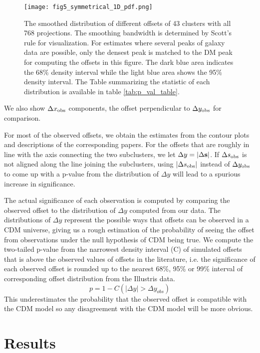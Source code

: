 \begin{figure*}
	\centering
	\texttt{[image: fig5\_symmetrical\_1D\_pdf.png]}
	\caption{The smoothed distribution of different offsets of 43 clusters with all 768
	projections. The smoothing bandwidth is determined by Scott's rule for 
	visualization.
	For estimates where several peaks of galaxy data are 
	possible, only the densest peak is matched to the DM peak for computing
	the offsets in this figure. 
	The dark blue area indicates the 68\% density interval
	while the light blue area shows the 95\% density interval. 
	The Table summarizing the statistic of each distribution is available in
	table \ref{tab:p_val_table}. 
		\label{fig:offset_distributions}}
\end{figure*}


We also show $\Delta x_{\rm obs}$ components, the offset perpendicular to
$\Delta y_{\rm obs}$ for comparison.

For most of the observed offsets, we obtain the estimates from the contour plots 
and descriptions of the corresponding papers. 
For the offsets that are roughly in line with the axis connecting the two subclusters,
we let $\Delta y = |\Delta {\bf s}|$. 
If $\Delta s_{\rm obs}$ is not aligned along the line joining the subclusters,
using $|\Delta s_{\rm obs}|$ instead of $\Delta y_{\rm obs}$ to come 
up with a p-value from the distribution of 
$\Delta y$ will lead to a spurious increase in significance.

The actual significance of each observation is computed by comparing the
observed offset to the distribution of $\Delta y$ computed from our data. 
The distributions of $\Delta y$ represent the possible ways that offsets can be observed in a CDM
universe, giving us a rough estimation of the probability 
of seeing the offset from observations under the null hypothesis of CDM 
being true. 
We compute the two-tailed 
p-value from the narrowest density interval (C) of simulated offsets 
that is above the observed values of offsets in the literature, 
i.e. the significance of each observed offset is rounded up to the nearest 68\%, 95\% or 99\%
interval of corresponding offset distribution from the Illustris data. 
\begin{equation}
	p = 1 - C(|\Delta y| > \Delta y_{obs})
\end{equation}
This underestimates the probability that the
observed offset is compatible with the CDM model so
any disagreement with the CDM model will be more obvious. 

 
\section{Results} 
\label{sec:results}


